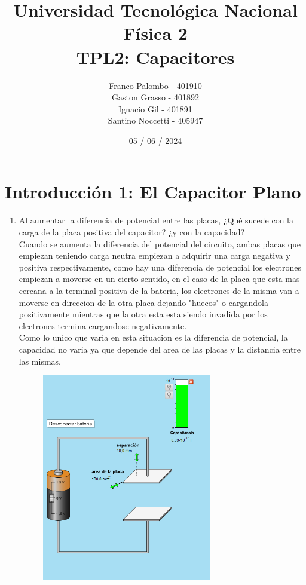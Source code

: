 \documentclass[12pt]{report}
\title{%
  \fontsize{25}{0}\selectfont Universidad Tecnológica Nacional \\
  \fontsize{22}{30}\selectfont Física 2 \\
  \fontsize{18}{25}\selectfont TPL2: Capacitores
}
\author{
  Franco Palombo - 401910\\
  Gaston Grasso - 401892\\
  Ignacio Gil - 401891\\
  Santino Noccetti - 405947\\
}
\date{05 / 06 / 2024}
\begin{document}
\maketitle

\section{Introducción 1: El Capacitor Plano}

\begin{enumerate}
    \item Al aumentar la diferencia de potencial entre las placas, ¿Qué sucede con la carga de la placa positiva del capacitor? ¿y con la capacidad?\\
    
    Cuando se aumenta la diferencia del potencial del circuito, ambas placas que empiezan teniendo carga neutra empiezan a adquirir una carga negativa y positiva respectivamente, como hay una diferencia de potencial los electrones empiezan a moverse en un cierto sentido, en el caso de la placa que esta mas cercana a la terminal positiva de la bateria, los electrones de la misma van a moverse en direccion de la otra placa  dejando "huecos" o cargandola positivamente mientras que la otra esta esta siendo invadida por los electrones termina cargandose negativamente.\\
    Como lo unico que varia en esta situacion es la diferencia de potencial, la capacidad no varia ya que depende del area de las placas y la distancia entre las mismas.\\

    
\begin{figure}[h]
    \centering
    \includegraphics[width=0.7\textwidth]{./images/1FOTO1.png}
\end{figure}


\end{enumerate}
\end{document}
